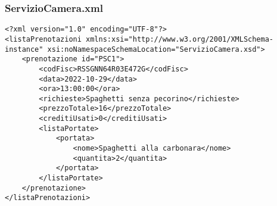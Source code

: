 \documentclass [a4paper, 12pt]{book}
\begin{document}
\subsubsection{ServizioCamera.xml}
\begin{lstlisting}[style=XML]
<?xml version="1.0" encoding="UTF-8"?>
<listaPrenotazioni xmlns:xsi="http://www.w3.org/2001/XMLSchema-instance" xsi:noNamespaceSchemaLocation="ServizioCamera.xsd">
    <prenotazione id="PSC1">
        <codFisc>RSSGNN64R03E472G</codFisc>
        <data>2022-10-29</data>
        <ora>13:00:00</ora>
        <richieste>Spaghetti senza pecorino</richieste>
        <prezzoTotale>16</prezzoTotale>
        <creditiUsati>0</creditiUsati>
        <listaPortate>
            <portata>
                <nome>Spaghetti alla carbonara</nome>
                <quantita>2</quantita>
            </portata>
        </listaPortate>
    </prenotazione>
</listaPrenotazioni>
\end{lstlisting}
\end{document}
